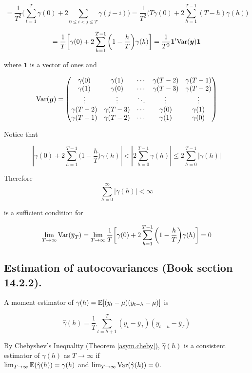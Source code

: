 \[
= \frac{1}{T^2} \bigg(\sum_{t=1}^T  \gamma(0) + 2 \sum_{0 \leq i < j \leq T } \gamma(j-i)  \bigg) = \frac{1}{T^2} \bigg( T  \gamma(0) + 2 \sum_{h = 1 }^{T-1} (T - h )\gamma(h)  \bigg)
\]

\[
= \frac{1}{T} \bigg[ \gamma(0) + 2 \sum_{h=1}^{T-1} \bigg(1 - \frac{h}{T} \bigg) \gamma(h) \bigg] = \frac{1}{T^2} \boldsymbol{1}' \mathrm{Var}(\boldsymbol{y}) \boldsymbol{1}
\]

where \(\boldsymbol{1}\) is a vector of ones and

\[
\mathrm{Var}(\boldsymbol{y}) = \begin{pmatrix} 
\gamma(0) &  \gamma(1) & \cdots  &  \gamma(T-2) & \gamma(T-1) \\
\gamma(1) &  \gamma(0) & \cdots  &  \gamma(T-3) & \gamma(T-2) \\
\vdots &  \vdots & \ddots  &  \vdots & \vdots \\
\gamma(T - 2) &  \gamma(T - 3) & \cdots  &  \gamma(0) & \gamma(1) \\
\gamma(T - 1) &  \gamma(T - 2) & \cdots  &  \gamma(1) & \gamma(0) 
\end{pmatrix} 
\]

Notice that

\[
\left| \gamma(0) + 2 \sum_{h=1}^{T-1} \bigg(1 - \frac{h}{T} \bigg) \gamma(h)  \right| < \left| 2 \sum_{h=0}^{T-1}\gamma(h) \right| \leq 2 \sum_{h=0}^{T-1} \left|  \gamma(h) \right| 
\]

Therefore
\[
\sum_{h=0}^{\infty} \left|  \gamma(h) \right| < \infty
\]

is a sufficient condition for 

\[
\lim_{T \to \infty} \mathrm{Var}(\overline{y}_T) = \lim_{T \to \infty}  \frac{1}{T} \bigg[ \gamma(0) + 2 \sum_{h=1}^{T-1} \bigg(1 - \frac{h}{T} \bigg) \gamma(h) \bigg]  = 0
\]

\subsection{Estimation of autocovariances (Book section 14.2.2).}
\label{sec:tsch14.2.2}

A moment estimator of \(\gamma(h) =  \mathbb{E}[(y_t - \mu)(y_{t-h} - \mu)]\) is

\[
\hat{\gamma}(h) = \frac{1}{T} \sum_{t=h+1}^T(y_t - \overline{y}_T)(y_{t-h} - \overline{y}_T)
\]

By Chebyshev's Inequality (Theorem \ref{asym.cheby}), \(\hat{\gamma}(h) \) is a consistent estimator of \(\gamma(h)\) as \(T \to \infty\) if \\ \(\lim_{T \to \infty} \mathbb{E}(\hat{\gamma}(h)) = \gamma(h)\) and \(\lim_{T \to \infty} \mathrm{Var}(\hat{\gamma}(h)) = 0\).

